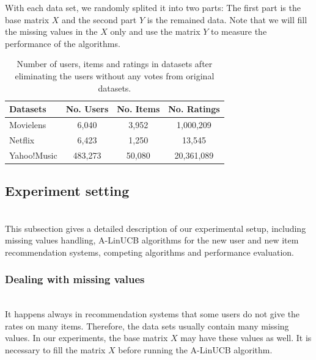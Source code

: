 \documentclass[twoside,leqno,twocolumn]{article}
\begin{document}
With each data set, we randomly splited it into two parts: The first part is the base matrix $X$ and the second part $Y$ is the remained data. Note that we will fill the missing values in the $X$ only and use the matrix $Y$ to measure the performance of the algorithms.
\begin{table}
  \caption{Number of users, items and ratings in datasets after eliminating the users without any votes from original datasets.}
  \centering
  \begin{tabular}{|l|c|c|c|}
    \hline
    Datasets & No. Users & No. Items & No. Ratings \\
    \hline
    Movielens & 6,040 & 3,952 & 1,000,209\\
    \hline
    Netflix & 6,423 & 1,250 & 13,545 \\
    \hline  
    Yahoo!Music & 483,273 & 50,080 & 20,361,089 \\
    \hline
  \end{tabular}
  \label{table:datasets}
\end{table}


\subsection{Experiment setting}
~\\
This subsection gives a detailed description of our experimental setup, including missing values handling, A-LinUCB algorithms for the new user and new item recommendation systems, competing algorithms and performance evaluation.

\subsubsection{Dealing with missing values}
~\\
It happens always in recommendation systems that some users do not give the rates on many items. Therefore, the data sets usually contain many missing values. In our experiments, the base matrix $X$ may have these values as well. It is necessary to fill the matrix $X$ before running the A-LinUCB algorithm. 
\end{document}
